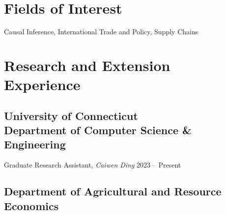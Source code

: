 \documentclass[11 pt,letterpaper]{article}
\renewenvironment{itemize}{
	\begin{list}{}{
			\setlength{\leftmargin}{1.5em}
		}
	}{
	\end{list}
}
\begin{document}
\begin{itemize}
		
		
	\end{itemize}
	
	\section*{\textbf{Fields of Interest}}
	
	Causal Inference, International Trade and Policy,  Supply Chains 
	
	\section*{\textbf{Research and Extension Experience}}
	
		\subsection*{University of Connecticut  \vspace{0.2 cm} \\  
			Department of Computer Science \& Engineering}
			\begin{itemize}
			\item[-] Graduate Research Assistant, \textit{Caiwen Ding}	\hfill    2023\,--\,  Present
		\end{itemize}
	\subsection*{Department of Agricultural and Resource Economics}
	
\end{document}
